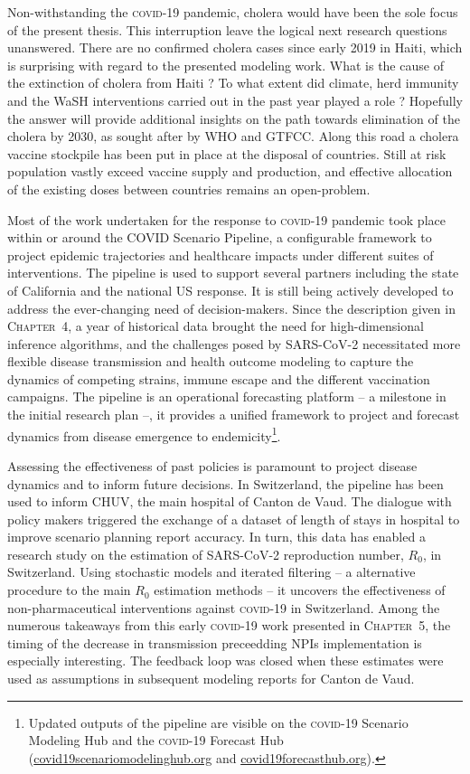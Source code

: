 Non-withstanding the \textsc{covid}-19 pandemic, cholera would have been the sole focus of the present thesis. This interruption leave the logical next research questions unanswered. There are no confirmed cholera cases since early 2019 in Haiti, which is surprising with regard to the presented modeling work. What is the cause of the extinction of cholera from Haiti ? To what extent did climate, herd immunity and the WaSH interventions carried out in the past year played a role ? Hopefully the answer will provide additional insights on the path towards elimination of the cholera by 2030, as sought after by WHO and GTFCC. Along this road a cholera vaccine stockpile has been put in place at the disposal of countries. Still at risk population vastly exceed vaccine supply and production\cite{Pezzoli:GlobalOralCholera:2019}, and effective allocation of the existing doses between countries remains an open-problem.

Most of the work undertaken for the response to \textsc{covid}-19 pandemic took place within or around the COVID Scenario Pipeline, a configurable framework to project epidemic trajectories and healthcare impacts under different suites of interventions. The pipeline is used to support several partners including the state of California and the national US response. It is still being actively developed to address the ever-changing need of decision-makers. Since the description given in \textsc{Chapter~4}, a year of historical data brought the need for high-dimensional inference algorithms, and the challenges posed by SARS-CoV-2 necessitated more flexible disease transmission and health outcome modeling to capture the dynamics of competing strains, immune escape and the different vaccination campaigns. The pipeline is an operational forecasting platform -- a milestone in the initial research plan --, it provides a unified framework to project and forecast dynamics from disease emergence to endemicity\footnote{Updated outputs of the pipeline are visible on the \textsc{covid}-19 Scenario Modeling Hub and the \textsc{covid}-19 Forecast Hub (\url{covid19scenariomodelinghub.org} and \url{covid19forecasthub.org}).}.

Assessing the effectiveness of past policies is paramount to project disease dynamics and to inform future decisions. In Switzerland, the pipeline has been used to inform CHUV, the main hospital of Canton de Vaud. The dialogue with policy makers triggered the exchange of a dataset of length of stays in hospital to improve scenario planning report accuracy. In turn, this data has enabled a research study on the estimation of SARS-CoV-2 reproduction number, $R_0$, in Switzerland. Using stochastic models and iterated filtering -- a alternative procedure to the main $R_0$ estimation methods -- it uncovers the effectiveness of non-pharmaceutical interventions against \textsc{covid-19} in Switzerland. Among the numerous takeaways from this early \textsc{covid}-19 work presented in \textsc{Chapter~5}, the timing of the decrease in transmission preceedding NPIs implementation is especially interesting. The feedback loop was closed when these estimates were used as assumptions in subsequent modeling reports for Canton de Vaud.

